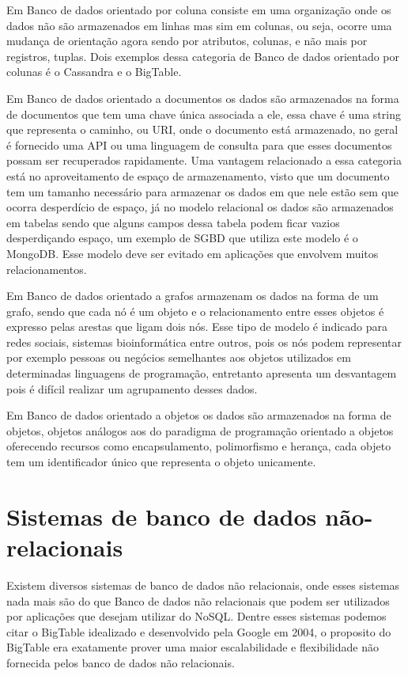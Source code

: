 \documentclass[12pt]{article}
\begin{document}
Em Banco de dados orientado por coluna consiste em uma organização onde os dados não são armazenados em linhas mas sim em colunas, ou seja, ocorre uma mudança de orientação agora sendo por atributos, colunas, e não mais por registros, tuplas. Dois exemplos dessa categoria de Banco de dados orientado por colunas é o Cassandra e o BigTable.\cite{brito2010bancos}\cite{surveyNosql:2012}

Em Banco de dados orientado a documentos os dados são armazenados na forma de documentos que tem uma chave única associada a ele, essa chave é uma string que representa o caminho, ou URI, onde o documento está armazenado, no geral é fornecido uma API ou uma linguagem de consulta para que esses documentos possam ser recuperados rapidamente. \cite{surveyNosql:2012} Uma vantagem relacionado a essa categoria está no aproveitamento de espaço de armazenamento, visto que um documento tem um tamanho necessário para armazenar os dados em que nele estão sem que ocorra desperdício de espaço, já no modelo relacional os dados são armazenados em tabelas sendo que alguns campos dessa tabela podem ficar vazios desperdiçando espaço, um exemplo de SGBD que utiliza este modelo é o MongoDB. Esse modelo deve ser evitado em aplicações que envolvem muitos relacionamentos.\cite{typeNOSQL:2013}

Em Banco de dados orientado a grafos armazenam os dados na forma de um grafo, sendo que cada nó é um objeto e o relacionamento entre esses objetos é expresso pelas arestas que ligam dois nós. Esse tipo de modelo é indicado para redes sociais, sistemas bioinformática entre outros, pois os nós podem representar por exemplo pessoas ou negócios semelhantes aos objetos utilizados em determinadas linguagens de programação, entretanto apresenta um desvantagem pois é difícil realizar um agrupamento desses dados.\cite{typeNOSQL:2013}\cite{surveyNosql:2012} 

Em Banco de dados orientado a objetos os dados são armazenados na forma de objetos, objetos análogos aos do paradigma de programação orientado a objetos oferecendo recursos como encapsulamento, polimorfismo e herança, cada objeto tem um identificador único que representa o objeto unicamente.\cite{typeNOSQL:2013}

\section{Sistemas de banco de dados não-relacionais}
\label{sec:sistemas}

Existem diversos sistemas de banco de dados não relacionais, onde esses sistemas nada mais são do que Banco de dados não relacionais que podem ser utilizados por aplicações que desejam utilizar do NoSQL. Dentre esses sistemas podemos citar o BigTable idealizado e desenvolvido pela Google em 2004, o proposito do BigTable era exatamente prover uma maior escalabilidade e flexibilidade não fornecida pelos banco de dados não relacionais.\cite{brito2010bancos}
\end{document}
